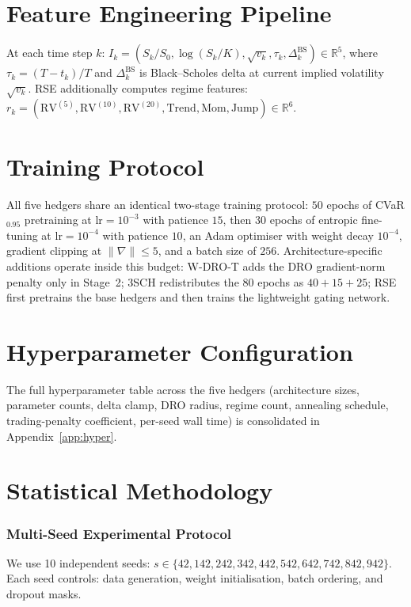 \documentclass[11pt,oneside]{report}
\newcommand{\R}{\mathbb{R}}
\begin{document}
\section{Feature Engineering Pipeline}

At each time step $k$: $I_k = (S_k/S_0, \log(S_k/K), \sqrt{v_k}, \tau_k, \Delta_k^{\mathrm{BS}}) \in \R^5$, where $\tau_k = (T-t_k)/T$ and $\Delta_k^{\mathrm{BS}}$ is Black--Scholes delta at current implied volatility $\sqrt{v_k}$. RSE additionally computes regime features: $r_k = (\mathrm{RV}^{(5)}, \mathrm{RV}^{(10)}, \mathrm{RV}^{(20)}, \mathrm{Trend}, \mathrm{Mom}, \mathrm{Jump}) \in \R^6$.

\section{Training Protocol}

All five hedgers share an identical two-stage training protocol: $50$ epochs of CVaR$_{0.95}$ pretraining at $\mathrm{lr}=10^{-3}$ with patience $15$, then $30$ epochs of entropic fine-tuning at $\mathrm{lr}=10^{-4}$ with patience $10$, an Adam optimiser with weight decay $10^{-4}$, gradient clipping at $\|\nabla\|\le5$, and a batch size of $256$.  Architecture-specific additions operate inside this budget: W-DRO-T adds the DRO gradient-norm penalty only in Stage~2; 3SCH redistributes the $80$ epochs as $40+15+25$; RSE first pretrains the base hedgers and then trains the lightweight gating network.

\section{Hyperparameter Configuration}
The full hyperparameter table across the five hedgers (architecture sizes, parameter counts, delta clamp, DRO radius, regime count, annealing schedule, trading-penalty coefficient, per-seed wall time) is consolidated in Appendix~\ref{app:hyper}.

\section{Statistical Methodology}
\label{sec:stats}

\subsubsection{Multi-Seed Experimental Protocol}

We use 10 independent seeds: $s \in \{42, 142, 242, 342, 442, 542, 642, 742, 842, 942\}$. Each seed controls: data generation, weight initialisation, batch ordering, and dropout masks.
\end{document}

